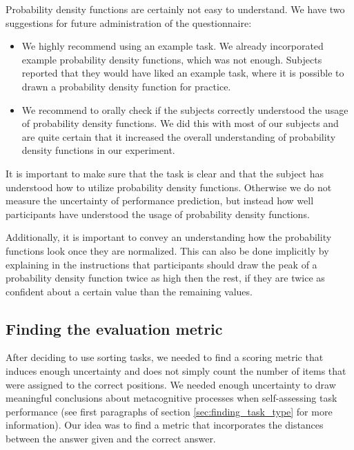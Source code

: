 \documentclass[../main/main.tex]{subfiles}
\begin{document}
	Probability density functions are certainly not easy to understand. We have two suggestions for future administration of the questionnaire:
	
	\begin{itemize}
		\item We highly recommend using an example task. We already incorporated example probability density functions, which was not enough. Subjects reported that they would have liked an example task, where it is possible to drawn a probability density function for practice.
		\item We recommend to orally check if the subjects correctly understood the usage of probability density functions. We did this with most of our subjects and are quite certain that it increased the overall understanding of probability density functions in our experiment.
	\end{itemize}
	
	\noindent It is important to make sure that the task is clear and that the subject has understood how to utilize probability density functions. Otherwise we do not measure the uncertainty of performance prediction, but instead how well participants have understood the usage of probability density functions.
	
	Additionally, it is important to convey an understanding how the probability functions look once they are normalized. This can also be done implicitly by explaining in the instructions that participants should draw the peak of a probability density function twice as high then the rest, if they are twice as confident about a certain value than the remaining values.
	
	\subsection{Finding the evaluation metric}
	\label{sec:finding_metric}
	
	After deciding to use sorting tasks, we needed to find a scoring metric that induces enough uncertainty and does not simply count the number of items that were assigned to the correct positions. We needed enough uncertainty to draw meaningful conclusions about metacognitive processes when self-assessing task performance (see first paragraphs of section \ref{sec:finding_task_type} for more information). Our idea was to find a metric that incorporates the distances between the answer given and the correct answer.
	
\end{document}
